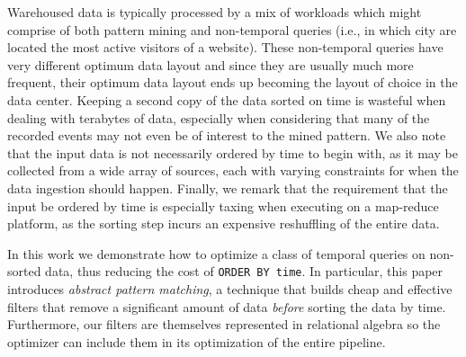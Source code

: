 Warehoused data is typically processed by a mix of workloads which might 
comprise of both pattern mining and non-temporal queries (i.e., in which city 
are located the most active visitors of a website).  
These non-temporal queries have very different optimum data layout and since 
they are usually much more frequent, their optimum data layout ends up becoming 
the layout of choice in the data center.  
Keeping a second copy of the data sorted on time is wasteful when dealing with 
terabytes of data, especially when considering that many of the recorded events 
may not even be of interest to the mined pattern. 
We also note that the input data is not necessarily ordered by time
to begin with, as it may be collected from a wide array of sources,
each with varying constraints for when the data ingestion should happen. 
Finally, we remark that the requirement that the input be ordered by time is 
especially taxing when executing on a map-reduce platform, as the sorting step 
incurs an expensive reshuffling of the entire data.

%

In this work we demonstrate how to optimize a class of temporal queries on
non-sorted data, thus reducing the cost of \texttt{ORDER BY time}. In
particular, this paper introduces {\em abstract pattern matching}, a technique
that builds cheap and effective filters that remove a significant amount of data
\emph{before} sorting the data by time.  Furthermore, our filters are themselves
represented in relational algebra so the optimizer can include them in its
optimization of the entire pipeline.


